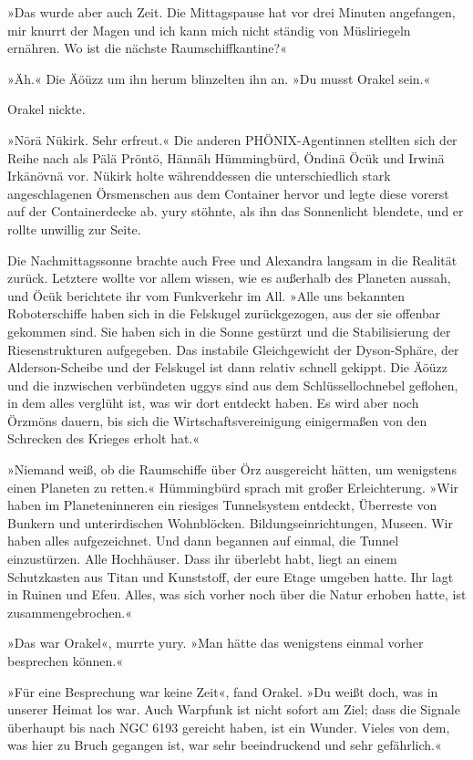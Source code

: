 »Das wurde aber auch Zeit. Die Mittagspause hat vor drei Minuten angefangen, mir knurrt der Magen und ich kann mich nicht ständig von Müsliriegeln ernähren. Wo ist die nächste Raumschiffkantine?«

»Äh.« Die Äöüzz um ihn herum blinzelten ihn an. »Du musst Orakel sein.«

Orakel nickte.

»Nörä Nükirk. Sehr erfreut.« Die anderen PHÖNIX-Agentinnen stellten sich der Reihe nach als Pälä Pröntö, Hännäh Hümmingbürd, Öndinä Öcük und Irwinä Irkänövnä vor. Nükirk holte währenddessen die unterschiedlich stark angeschlagenen Örsmenschen aus dem Container hervor und legte diese vorerst auf der Containerdecke ab. yury stöhnte, als ihn das Sonnenlicht blendete, und er rollte unwillig zur Seite.

Die Nachmittagssonne brachte auch Free und Alexandra langsam in die Realität zurück. Letztere wollte vor allem wissen, wie es außerhalb des Planeten aussah, und Öcük berichtete ihr vom Funkverkehr im All. »Alle uns bekannten Roboterschiffe haben sich in die Felskugel zurückgezogen, aus der sie offenbar gekommen sind. Sie haben sich in die Sonne gestürzt und die Stabilisierung der Riesenstrukturen aufgegeben. Das instabile Gleichgewicht der Dyson-Sphäre, der Alderson-Scheibe und der Felskugel ist dann relativ schnell gekippt. Die Äöüzz und die inzwischen verbündeten uggys sind aus dem Schlüssellochnebel geflohen, in dem alles verglüht ist, was wir dort entdeckt haben. Es wird aber noch Örzmöns dauern, bis sich die Wirtschaftsvereinigung einigermaßen von den Schrecken des Krieges erholt hat.«

»Niemand weiß, ob die Raumschiffe über Örz ausgereicht hätten, um wenigstens einen Planeten zu retten.« Hümmingbürd sprach mit großer Erleichterung. »Wir haben im Planeteninneren ein riesiges Tunnelsystem entdeckt, Überreste von Bunkern und unterirdischen Wohnblöcken. Bildungseinrichtungen, Museen. Wir haben alles aufgezeichnet. Und dann begannen auf einmal, die Tunnel einzustürzen. Alle Hochhäuser. Dass ihr überlebt habt, liegt an einem Schutzkasten aus Titan und Kunststoff, der eure Etage umgeben hatte. Ihr lagt in Ruinen und Efeu. Alles, was sich vorher noch über die Natur erhoben hatte, ist zusammengebrochen.«

»Das war Orakel«, murrte yury. »Man hätte das wenigstens einmal vorher besprechen können.«

»Für eine Besprechung war keine Zeit«, fand Orakel. »Du weißt doch, was in unserer Heimat los war. Auch Warpfunk ist nicht sofort am Ziel; dass die Signale überhaupt bis nach NGC 6193 gereicht haben, ist ein Wunder. Vieles von dem, was hier zu Bruch gegangen ist, war sehr beeindruckend und sehr gefährlich.«

